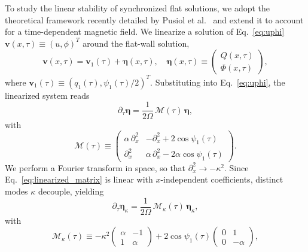 \documentclass[prb,aps,twocolumn,superscriptaddress,floatfix]{revtex4-2}
\begin{document}
To study the linear stability of synchronized flat solutions, we adopt the theoretical framework recently detailed by Pusiol et al.~\cite{pusiol2026deterministic} and extend it to account for a time-dependent magnetic field. We linearize a solution of Eq.~\eqref{eq:uphi} $\mathbf{v}(x,\tau)\equiv(u,\phi)^{T}$ around the flat-wall solution,
\begin{equation}
    \mathbf{v}(x,\tau) = \mathbf{v}_{1}(\tau) + \boldsymbol{\eta}(x,\tau), \quad \boldsymbol{\eta}(x,\tau) \equiv \begin{pmatrix} Q(x,\tau) \\ \Phi(x,\tau) \end{pmatrix},
\end{equation}
where $\mathbf{v}_{1}(\tau)\equiv(q_{1}(\tau),\psi_1(\tau)/2)^{T}$. Substituting into Eq.~\eqref{eq:uphi}, the linearized system reads
\begin{equation}
    \partial_\tau \boldsymbol{\eta} = \frac{1}{2\Omega}\,\mathcal{M}(\tau)\,\boldsymbol{\eta},
    \label{eq:linearized_matrix}
\end{equation}
with
\begin{equation}
    \mathcal{M}(\tau) \equiv
    \begin{pmatrix}
    \alpha\,\partial_x^2 & -\partial_x^2+2\cos\psi_1(\tau) \\
    \partial_x^2 & \alpha\,\partial_x^2-2\alpha\cos\psi_1(\tau)
    \end{pmatrix}.
    \label{eq:stability_matrix}
\end{equation}
We perform a Fourier transform in space, so that $\partial_x^2\to-\kappa^2$. Since Eq.~\eqref{eq:linearized_matrix} is linear with $x$-independent coefficients, distinct modes $\kappa$ decouple, yielding
\begin{equation}
    \partial_\tau \boldsymbol{\eta}_\kappa = \frac{1}{2\Omega}\,\mathcal{M}_\kappa(\tau)\,\boldsymbol{\eta}_\kappa,
    \label{eq:linearized_mode}
\end{equation}
with
\begin{equation}
    \mathcal{M}_\kappa(\tau) \equiv -\kappa^2
    \begin{pmatrix}
    \alpha & -1 \\
    1 & \alpha
    \end{pmatrix}
    + 2\cos\psi_1(\tau)
    \begin{pmatrix}
    0 & 1 \\
    0 & -\alpha
    \end{pmatrix},
    \label{eq:stability_matrix_split}
\end{equation}
\end{document}
